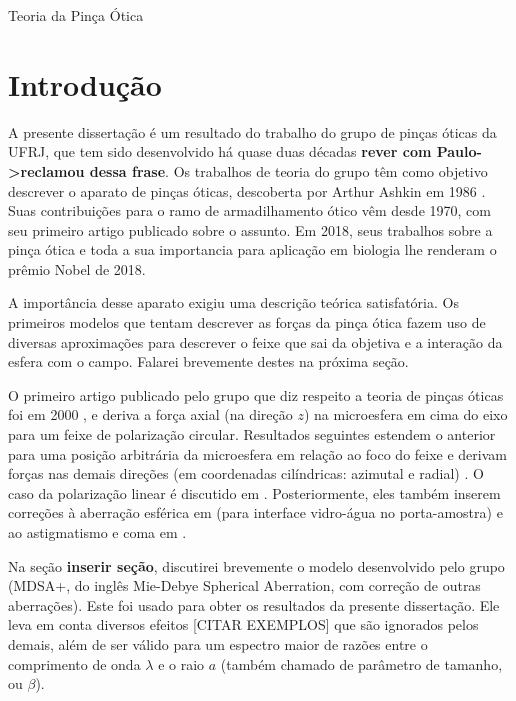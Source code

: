 \begin{chapter}{Teoria da Pinça Ótica}
\label{cap2}

\section{Introdução}

\hspace{5 mm}A presente dissertação é um resultado do trabalho do grupo de pinças óticas da UFRJ, que tem sido desenvolvido há quase duas décadas {\bf rever com Paulo->reclamou dessa frase}. Os trabalhos de teoria do grupo têm como objetivo descrever o aparato de pinças óticas, descoberta por Arthur Ashkin em 1986\cite{Ashkin1986} \cite{Ashkin1977}. Suas contribuições para o ramo de armadilhamento ótico vêm desde 1970, com seu primeiro artigo publicado sobre o assunto\cite{Ashkin1970}.
Em 2018, seus trabalhos sobre a pinça ótica e toda a sua importancia para aplicação em biologia lhe renderam o prêmio Nobel de 2018. 

A importância desse aparato exigiu uma descrição teórica satisfatória. Os primeiros modelos que tentam descrever as forças da pinça ótica fazem uso de diversas aproximações para descrever o feixe que sai da objetiva e a interação da esfera com o campo. Falarei brevemente destes na próxima seção.

O primeiro artigo publicado pelo grupo que diz respeito a teoria de pinças óticas foi em 2000 \cite{Neto2000}, e deriva a força axial (na direção $z$) na microesfera em cima do eixo para um feixe de polarização circular. Resultados seguintes estendem o anterior para uma posição arbitrária da microesfera em relação ao foco do feixe e derivam forças nas demais direções (em coordenadas cilíndricas: azimutal e radial) \cite{Mazolli2003}. O caso da polarização linear é discutido em \cite{Dutra2007}. Posteriormente, eles também inserem correções à aberração esférica em \cite{Viana2007} (para interface vidro-água no porta-amostra) e ao astigmatismo e coma em \cite{Dutra2014}.

Na seção {\bf inserir seção}, discutirei brevemente o modelo desenvolvido pelo grupo (MDSA+, do inglês Mie-Debye Spherical Aberration, com correção de outras aberrações). Este foi usado para obter os resultados da presente dissertação. Ele leva em conta diversos efeitos [CITAR EXEMPLOS] que são ignorados pelos demais, além de ser válido para um espectro maior de razões entre o comprimento de onda $\lambda$ e o raio $a$ (também chamado de parâmetro de tamanho, ou $\beta$).


\end{chapter}
